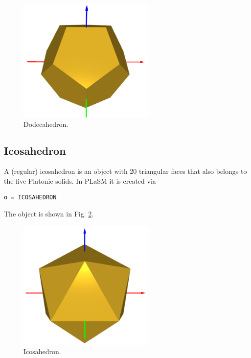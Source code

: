 \begin{figure}[!ht]
\begin{center}
\includegraphics[width=0.6\textwidth]{img/dodeca-2.png}
\end{center}
\vspace{-4mm}
\caption{Dodecahedron.}
\label{fig:dodeca}
\vspace{-1cm}
\end{figure}
\newpage

\subsection{Icosahedron}

A (regular) icosahedron is an object with 20 triangular faces
that also belongs to the five Platonic solids. In PLaSM it 
is created via\\

\begin{bbox}
\begin{verbatim}
o = ICOSAHEDRON
\end{verbatim}
\end{bbox}
\vspace{6mm}

\noindent
The object is shown in Fig. \ref{fig:icosa}.

\begin{figure}[!ht]
\begin{center}
\includegraphics[width=0.6\textwidth]{img/icosa-2.png}
\end{center}
\vspace{-4mm}
\caption{Icosahedron.}
\label{fig:icosa}
\end{figure}

